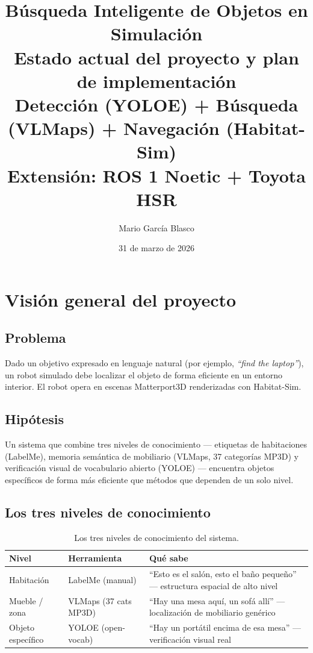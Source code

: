 \documentclass[11pt,a4paper]{article}
\title{\textbf{Búsqueda Inteligente de Objetos en Simulación}\\[0.3cm]
\large Estado actual del proyecto y plan de implementación\\[0.2cm]
\normalsize Detección (YOLOE) + Búsqueda (VLMaps) + Navegación (Habitat-Sim)\\[0.2cm]
\normalsize Extensión: ROS 1 Noetic + Toyota HSR}
\author{Mario García Blasco}
\date{31 de marzo de 2026}
\begin{document}
\maketitle
\tableofcontents
\newpage

\section{Visión general del proyecto}

\subsection{Problema}
Dado un objetivo expresado en lenguaje natural (por ejemplo, \textit{``find the laptop''}), un robot simulado debe localizar el objeto de forma eficiente en un entorno interior. El robot opera en escenas Matterport3D renderizadas con Habitat-Sim.

\subsection{Hipótesis}
Un sistema que combine tres niveles de conocimiento --- etiquetas de habitaciones (LabelMe), memoria semántica de mobiliario (VLMaps, 37 categorías MP3D) y verificación visual de vocabulario abierto (YOLOE) --- encuentra objetos específicos de forma más eficiente que métodos que dependen de un solo nivel.

\subsection{Los tres niveles de conocimiento}

\begin{table}[h]
\centering
\begin{tabular}{llp{7cm}}
\toprule
\textbf{Nivel} & \textbf{Herramienta} & \textbf{Qué sabe} \\
\midrule
Habitación & LabelMe (manual) & ``Esto es el salón, esto el baño pequeño'' --- estructura espacial de alto nivel \\
Mueble / zona & VLMaps (37 cats MP3D) & ``Hay una mesa aquí, un sofá allí'' --- localización de mobiliario genérico \\
Objeto específico & YOLOE (open-vocab) & ``Hay un portátil encima de esa mesa'' --- verificación visual real \\
\bottomrule
\end{tabular}
\caption{Los tres niveles de conocimiento del sistema.}
\end{table}
\end{document}
